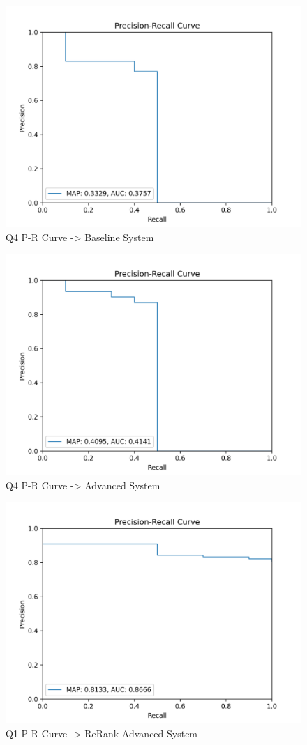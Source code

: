 \documentclass[sigconf]{acmart}
\begin{document}
\begin{figure}[H]
  \centering
  \includegraphics[width=0.8\linewidth]{precision_recall_q4b.png}
  \caption{Q4 P-R Curve -> Baseline System}
  \label{fig:precisionRecallBaseline4}
\end{figure}

\begin{figure}[H]
  \centering
  \includegraphics[width=0.8\linewidth]{precision_recall_q4a.png}
  \caption{Q4 P-R Curve -> Advanced System}
  \label{fig:precisionRecallAdvanced4}
\end{figure}

\begin{figure}[H]
  \centering
  \includegraphics[width=0.8\linewidth]{precision_recall_q1r.png}
  \caption{Q1 P-R Curve -> ReRank Advanced System}
  \label{fig:precisionRecallReRank1}
\end{figure}
\end{document}
